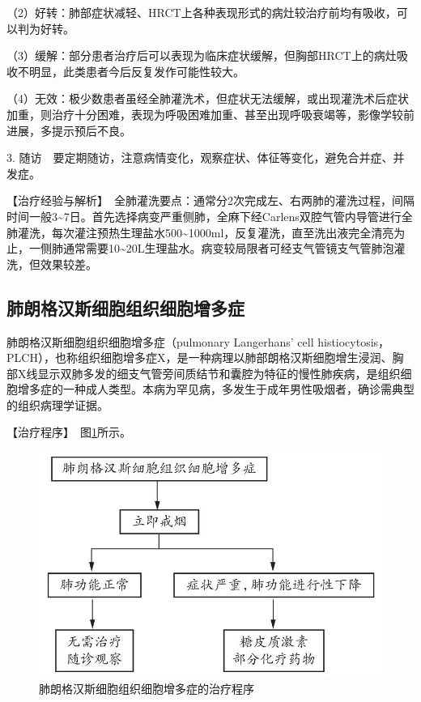 （2）好转：肺部症状减轻、HRCT上各种表现形式的病灶较治疗前均有吸收，可以判为好转。

（3）缓解：部分患者治疗后可以表现为临床症状缓解，但胸部HRCT上的病灶吸收不明显，此类患者今后反复发作可能性较大。

（4）无效：极少数患者虽经全肺灌洗术，但症状无法缓解，或出现灌洗术后症状加重，则治疗十分困难，表现为呼吸困难加重、甚至出现呼吸衰竭等，影像学较前进展，多提示预后不良。

3.
随访　要定期随访，注意病情变化，观察症状、体征等变化，避免合并症、并发症。

【治疗经验与解析】　全肺灌洗要点：通常分2次完成左、右两肺的灌洗过程，间隔时间一般3\textasciitilde{}7日。首先选择病变严重侧肺，全麻下经Carlens双腔气管内导管进行全肺灌洗，每次灌注预热生理盐水500\textasciitilde{}1000ml，反复灌洗，直至洗出液完全清亮为止，一侧肺通常需要10\textasciitilde{}20L生理盐水。病变较局限者可经支气管镜支气管肺泡灌洗，但效果较差。

\subsection{肺朗格汉斯细胞组织细胞增多症}

肺朗格汉斯细胞组织细胞增多症（pulmonary Langerhans' cell
histiocytosis，PLCH），也称组织细胞增多症X，是一种病理以肺部朗格汉斯细胞增生浸润、胸部X线显示双肺多发的细支气管旁间质结节和囊腔为特征的慢性肺疾病，是组织细胞增多症的一种成人类型。本病为罕见病，多发生于成年男性吸烟者，确诊需典型的组织病理学证据。

【治疗程序】　图\ref{fig1-14-7}所示。

\begin{figure}[!htbp]
 \centering
 \includegraphics{./images/Image00035.jpg}
 \captionsetup{justification=centering}
 \caption{肺朗格汉斯细胞组织细胞增多症的治疗程序}
 \label{fig1-14-7}
  \end{figure} 

